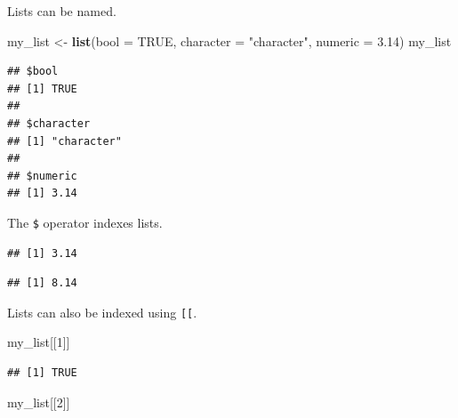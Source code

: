 \documentclass[openany]{book}
\newenvironment{Shaded}{\begin{snugshade}}{\end{snugshade}}
\newcommand{\DataTypeTok}[1]{\textcolor[rgb]{0.13,0.29,0.53}{#1}}
\newcommand{\DecValTok}[1]{\textcolor[rgb]{0.00,0.00,0.81}{#1}}
\newcommand{\FloatTok}[1]{\textcolor[rgb]{0.00,0.00,0.81}{#1}}
\newcommand{\KeywordTok}[1]{\textcolor[rgb]{0.13,0.29,0.53}{\textbf{#1}}}
\newcommand{\NormalTok}[1]{#1}
\newcommand{\OperatorTok}[1]{\textcolor[rgb]{0.81,0.36,0.00}{\textbf{#1}}}
\newcommand{\OtherTok}[1]{\textcolor[rgb]{0.56,0.35,0.01}{#1}}
\newcommand{\StringTok}[1]{\textcolor[rgb]{0.31,0.60,0.02}{#1}}
\begin{document}
Lists can be named.

\begin{Shaded}
\begin{Highlighting}[]
\NormalTok{my_list <-}\StringTok{ }\KeywordTok{list}\NormalTok{(}\DataTypeTok{bool =} \OtherTok{TRUE}\NormalTok{, }\DataTypeTok{character =} \StringTok{"character"}\NormalTok{, }\DataTypeTok{numeric =} \FloatTok{3.14}\NormalTok{)}
\NormalTok{my_list}
\end{Highlighting}
\end{Shaded}

\begin{verbatim}
## $bool
## [1] TRUE
## 
## $character
## [1] "character"
## 
## $numeric
## [1] 3.14
\end{verbatim}

The \texttt{\$} operator indexes lists.

\begin{Shaded}
\end{Shaded}

\begin{verbatim}
## [1] 3.14
\end{verbatim}

\begin{Shaded}
\end{Shaded}

\begin{verbatim}
## [1] 8.14
\end{verbatim}

Lists can also be indexed using \texttt{{[}{[}}.

\begin{Shaded}
\begin{Highlighting}[]
\NormalTok{my_list[[}\DecValTok{1}\NormalTok{]]}
\end{Highlighting}
\end{Shaded}

\begin{verbatim}
## [1] TRUE
\end{verbatim}

\begin{Shaded}
\begin{Highlighting}[]
\NormalTok{my_list[[}\DecValTok{2}\NormalTok{]]}
\end{Highlighting}
\end{Shaded}
\end{document}
